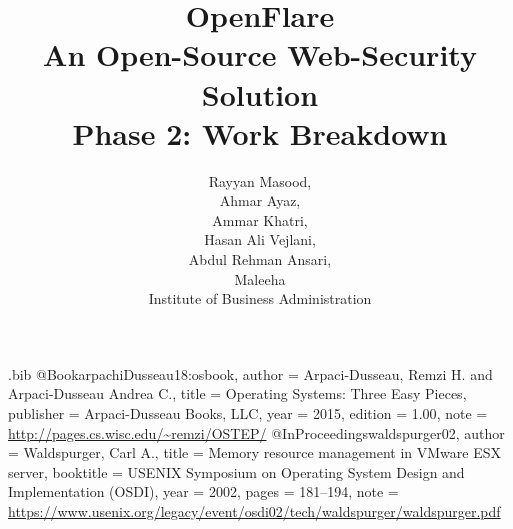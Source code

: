 \usepackage{filecontents}


\begin{filecontents}{\jobname.bib}
@Book{arpachiDusseau18:osbook,
  author =       {Arpaci-Dusseau, Remzi H. and Arpaci-Dusseau Andrea C.},
  title =        {Operating Systems: Three Easy Pieces},
  publisher =    {Arpaci-Dusseau Books, LLC},
  year =         2015,
  edition =      {1.00},
  note =         {\url{http://pages.cs.wisc.edu/~remzi/OSTEP/}}
}
@InProceedings{waldspurger02,
  author =       {Waldspurger, Carl A.},
  title =        {Memory resource management in {VMware ESX} server},
  booktitle =    {USENIX Symposium on Operating System Design and
                  Implementation (OSDI)},
  year =         2002,
  pages =        {181--194},
  note =         {\url{https://www.usenix.org/legacy/event/osdi02/tech/waldspurger/waldspurger.pdf}}}
\end{filecontents}



\date{}

\title{\Large \bf OpenFlare\\
  An Open-Source Web-Security Solution \\ Phase 2: Work Breakdown}

\author{
{\rm Rayyan Masood, \\ \rm Ahmar Ayaz, \\ \rm Ammar Khatri, \\ \rm Hasan Ali Vejlani, \\ \rm Abdul Rehman Ansari, \\ \rm Maleeha}\\
Institute of Business Administration
}
{
} %

\maketitle

